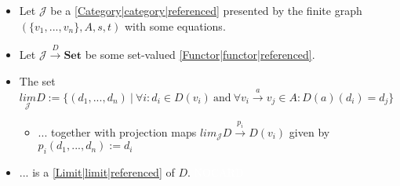 
\begin{itemize}
    \item Let $\mathcal{J}$ be a \ref{Category|category|referenced} presented by the finite graph $(\{v_1,...,v_n\},A,s,t)$ with some equations.
    \item Let $\mathcal{J}\xrightarrow{D}\mathbf{Set}$ be some set-valued \ref{Functor|functor|referenced}.
    \item The set $\underset{\mathcal{J}}{lim}D := \{(d_1,...,d_n)\ |\ \forall i: d_i \in D(v_i)\ \text{and}\ \forall v_i\xrightarrow{a}v_j \in A: D(a)(d_i)=d_j\}$
          \begin{itemize}\item ... together with projection maps $lim_\mathcal{J}D \xrightarrow{p_i}D(v_i)$ given by $p_i(d_1,...,d_n):=d_i$
          \end{itemize}
    \item ... is a \ref{Limit|limit|referenced} of $D$. \textcolor{white}{NOCARD}
  \end{itemize}